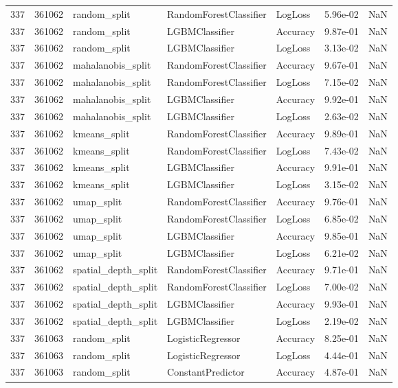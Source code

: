 \begin{tabular}{rrlllrr}
337 & 361062 & random\_split & RandomForestClassifier & LogLoss & 5.96e-02 & NaN \\
337 & 361062 & random\_split & LGBMClassifier & Accuracy & 9.87e-01 & NaN \\
337 & 361062 & random\_split & LGBMClassifier & LogLoss & 3.13e-02 & NaN \\
337 & 361062 & mahalanobis\_split & RandomForestClassifier & Accuracy & 9.67e-01 & NaN \\
337 & 361062 & mahalanobis\_split & RandomForestClassifier & LogLoss & 7.15e-02 & NaN \\
337 & 361062 & mahalanobis\_split & LGBMClassifier & Accuracy & 9.92e-01 & NaN \\
337 & 361062 & mahalanobis\_split & LGBMClassifier & LogLoss & 2.63e-02 & NaN \\
337 & 361062 & kmeans\_split & RandomForestClassifier & Accuracy & 9.89e-01 & NaN \\
337 & 361062 & kmeans\_split & RandomForestClassifier & LogLoss & 7.43e-02 & NaN \\
337 & 361062 & kmeans\_split & LGBMClassifier & Accuracy & 9.91e-01 & NaN \\
337 & 361062 & kmeans\_split & LGBMClassifier & LogLoss & 3.15e-02 & NaN \\
337 & 361062 & umap\_split & RandomForestClassifier & Accuracy & 9.76e-01 & NaN \\
337 & 361062 & umap\_split & RandomForestClassifier & LogLoss & 6.85e-02 & NaN \\
337 & 361062 & umap\_split & LGBMClassifier & Accuracy & 9.85e-01 & NaN \\
337 & 361062 & umap\_split & LGBMClassifier & LogLoss & 6.21e-02 & NaN \\
337 & 361062 & spatial\_depth\_split & RandomForestClassifier & Accuracy & 9.71e-01 & NaN \\
337 & 361062 & spatial\_depth\_split & RandomForestClassifier & LogLoss & 7.00e-02 & NaN \\
337 & 361062 & spatial\_depth\_split & LGBMClassifier & Accuracy & 9.93e-01 & NaN \\
337 & 361062 & spatial\_depth\_split & LGBMClassifier & LogLoss & 2.19e-02 & NaN \\
337 & 361063 & random\_split & LogisticRegressor & Accuracy & 8.25e-01 & NaN \\
337 & 361063 & random\_split & LogisticRegressor & LogLoss & 4.44e-01 & NaN \\
337 & 361063 & random\_split & ConstantPredictor & Accuracy & 4.87e-01 & NaN \\

\end{tabular}
